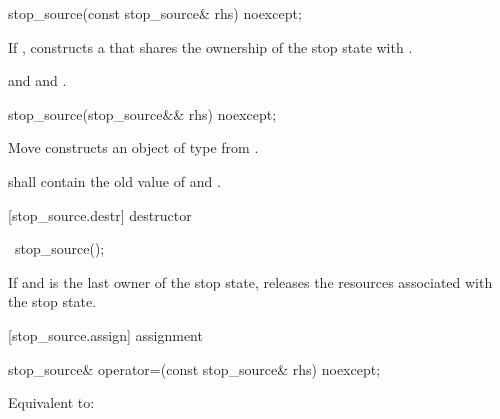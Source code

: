 {%

%
\begin{itemdecl}
stop_source(const stop_source& rhs) noexcept;
\end{itemdecl}
\begin{itemdescr}
  \pnum\effects If ,
                constructs a 
                that shares the ownership of the stop state with .

  \pnum\postconditions {}
                and 
                and .
\end{itemdescr}

%
\begin{itemdecl}
stop_source(stop_source&& rhs) noexcept;
\end{itemdecl}
\begin{itemdescr}
  \pnum\effects Move constructs an object of type  from .

  \pnum\postconditions {} shall contain the old value of  and
                        .
\end{itemdescr}

[stop_source.destr]{ destructor}

%
\begin{itemdecl}
~stop_source();
\end{itemdecl}

\begin{itemdescr}
 \pnum\effects If  and  is the last owner of the stop state,
                releases the resources associated with the stop state.
\end{itemdescr}

[stop_source.assign]{ assignment}

%
\begin{itemdecl}
stop_source& operator=(const stop_source& rhs) noexcept;
\end{itemdecl}
\begin{itemdescr}
  \pnum\effects Equivalent to: 


\end{itemdescr}}
